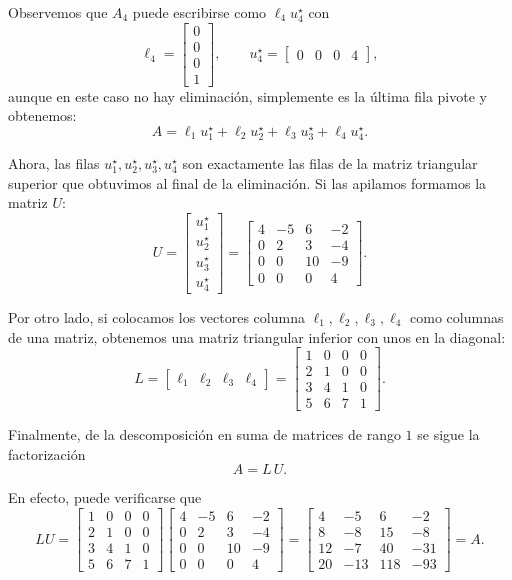 Observemos que $A_4$ puede escribirse como $\ell_4 u_4^\star$ con
\[
\ell_4 = \begin{bmatrix} 0 \\ 0 \\ 0 \\ 1 \end{bmatrix}, \qquad
u_4^\star = \begin{bmatrix} 0 & 0 & 0 & 4 \end{bmatrix},
\]
aunque en este caso no hay eliminación, simplemente es la última fila pivote y obtenemos: 
\[
A = \ell_1 u_1^\star + \ell_2 u_2^\star + \ell_3 u_3^\star +\ell_4 u_4^\star.
\]

Ahora, las filas $u_1^\star, u_2^\star, u_3^\star, u_4^\star$ son exactamente las filas de la matriz triangular superior que obtuvimos al final de la eliminación. Si las apilamos formamos la matriz $U$:
\[
U =
\begin{bmatrix} u_1^\star \\ u_2^\star \\ u_3^\star \\ u_4^\star \end{bmatrix}
=
\begin{bmatrix}
4 & -5 &  6 & -2 \\
0 &  2 &  3 & -4 \\
0 &  0 & 10 & -9 \\
0 &  0 &  0 &  4
\end{bmatrix}.
\]

Por otro lado, si colocamos los vectores columna $\ell_1, \ell_2, \ell_3, \ell_4$ como columnas de una matriz, obtenemos una matriz triangular inferior con unos en la diagonal:
\[
L =
\begin{bmatrix}
\ell_1 & \ell_2 & \ell_3 & \ell_4
\end{bmatrix}
=
\begin{bmatrix}
1 & 0 & 0 & 0 \\
2 & 1 & 0 & 0 \\
3 & 4 & 1 & 0 \\
5 & 6 & 7 & 1
\end{bmatrix}.
\]

Finalmente, de la descomposición en suma de matrices de rango $1$ se sigue la factorización
\[
A = L\, U.
\]

En efecto, puede verificarse que
\[
L U =
\begin{bmatrix}
1 & 0 & 0 & 0 \\
2 & 1 & 0 & 0 \\
3 & 4 & 1 & 0 \\
5 & 6 & 7 & 1
\end{bmatrix}
\begin{bmatrix}
4 & -5 &  6 & -2 \\
0 &  2 &  3 & -4 \\
0 &  0 & 10 & -9 \\
0 &  0 &  0 &  4
\end{bmatrix}
=
\begin{bmatrix}
4 & -5 &  6 & -2 \\
8 & -8 & 15 & -8 \\
12 & -7 & 40 & -31 \\
20 & -13 & 118 & -93
\end{bmatrix}
= A.
\]

